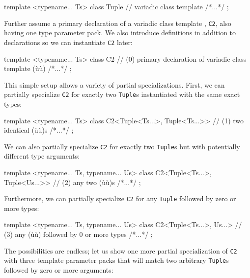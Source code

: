 \begin{emcppslisting}[emcppsbatch=e10]
template <typename... Ts> class Tuple  // variadic class template
{ /*...*/ };
\end{emcppslisting}
    

\noindent Further assume a primary declaration of a variadic class template ,
\lstinline!C2!, also having one type parameter pack. We also introduce
definitions in addition to declarations so we can instantiate
\lstinline!C2! later:

\begin{emcppslisting}[emcppsbatch=e10]
template <typename... Ts> class C2
    // (0) primary declaration of variadic class template (ù{}ù)
{ /*...*/ };
\end{emcppslisting}
    

\noindent This simple setup allows a variety of partial specializations. First, we
can partially specialize \lstinline!C2! for exactly two \lstinline!Tuple!s
instantiated with the same exact types:

\begin{emcppslisting}[emcppsbatch=e10]
template <typename... Ts>
class C2<Tuple<Ts...>, Tuple<Ts...>>  // (1) two identical (ù{}ù)s
{ /*...*/ };
\end{emcppslisting}
    

\noindent We can also partially specialize \lstinline!C2! for exactly two
\lstinline!Tuple!s but with potentially different type arguments:

\begin{emcppslisting}[emcppsbatch=e10]
template <typename... Ts, typename... Us>
class C2<Tuple<Ts...>, Tuple<Us...>>  // (2) any two (ù{}ù)s
{ /*...*/ };
\end{emcppslisting}
    

\noindent Furthermore, we can partially specialize \lstinline!C2! for any
\lstinline!Tuple! followed by zero or more types:

\begin{emcppslisting}[emcppsbatch=e10]
template <typename... Ts, typename... Us>
class C2<Tuple<Ts...>, Us...>  // (3) any (ù{}ù) followed by 0 or more types
{ /*...*/ };
\end{emcppslisting}
    

\noindent The possibilities are endless; let us show one more partial
specialization of \lstinline!C2! with three template parameter packs that
will match two arbitrary \lstinline!Tuple!s followed by zero or more
arguments:

